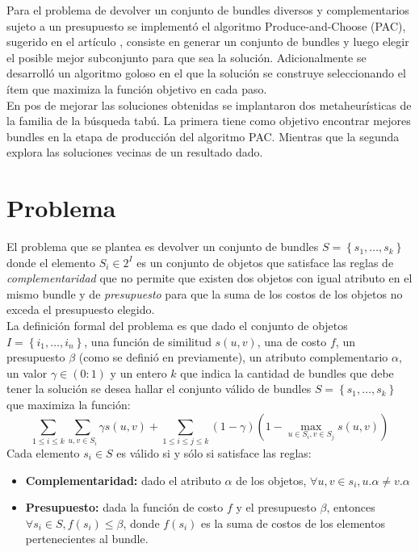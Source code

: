 Para el problema de devolver un conjunto de bundles diversos y complementarios sujeto a un presupuesto se implementó el algoritmo Produce-and-Choose (PAC), sugerido en el artículo \cite{compositeRetrival}, consiste en generar un conjunto de bundles y luego elegir el posible mejor subconjunto para que sea la solución. Adicionalmente se desarrolló un algoritmo goloso en el que la solución se construye seleccionando el ítem que maximiza la función objetivo en cada paso.\\
En pos de mejorar las soluciones obtenidas se implantaron dos metaheurísticas de la familia de la búsqueda tabú. La primera tiene como objetivo encontrar mejores bundles en la etapa de producción del algoritmo PAC. Mientras que la segunda explora las soluciones vecinas de un resultado dado.\\
\section{Problema}
El problema que se plantea es devolver un conjunto de bundles $S = \left\{s_1, \ldots, s_k\right\}$ donde el elemento $S_i \in 2^{I}$ es un conjunto de objetos que satisface las reglas de \textit{complementaridad} que no permite que existen dos objetos con igual atributo en el mismo bundle y de \textit{presupuesto} para que la suma de los costos de los objetos no exceda el presupuesto elegido.\\
La definición formal del problema es que dado el conjunto de objetos $I=\left\{i_1,\ldots, i_n\right\}$, una función de similitud $s(u,v)$, una de costo $f$, un presupuesto $\beta$ (como se definió en previamente), un atributo complementario $\alpha$, un valor $\gamma \in (0:1)$ y un entero $k$ que indica la cantidad de bundles que debe tener la solución se desea hallar el conjunto válido de bundles $S = \left\{s_1, \ldots, s_k\right\}$ que maximiza la función:
\begin{equation} \label{des:eq-fnObj}
\sum_{1 \leq i \leq k}{\sum_{u,v \in S_i}{\gamma s(u,v)}} + \sum_{1 \leq i \leq j \leq k}{(1-\gamma) (1-\max_{u \in S_i, v \in S_j}{s(u,v)})}
\end{equation}
Cada elemento $s_i \in S$ es válido si y sólo si satisface las reglas:
\begin{itemize}
	\item \textbf{Complementaridad:} dado el atributo $\alpha$ de los objetos, $\forall u,v \in s_i, u.\alpha \neq v.\alpha$
	\item \textbf{Presupuesto:} dada la función de costo $f$ y el presupuesto $\beta$, entonces $\forall s_i \in S, f(s_i) \leq \beta$, donde $f(s_i)$ es la suma de costos de los elementos pertenecientes al bundle.
\end{itemize}		  
